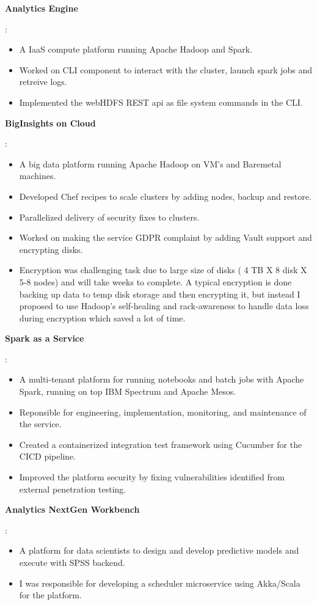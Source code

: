 \documentclass[a4paper,11pt]{article}
\newcommand{\resumeItem}[2]{
  \item[]\small{
    \textbf{#1}{: #2 \vspace{-2pt}}
  }
}
\begin{document}
\resumeItem{Analytics Engine}
{
    \begin{itemize}[leftmargin=*]
        \item A IaaS compute platform running Apache Hadoop and Spark.
        \item Worked on CLI component to interact with the cluster, launch spark jobs and retreive logs.
        \item Implemented the webHDFS REST api as file system commands in the CLI.
    \end{itemize}
}

\resumeItem{BigInsights on Cloud}
{
    \begin{itemize}[leftmargin=*]
        \item A big data platform running Apache Hadoop on VM's and Baremetal machines.
        \item Developed Chef recipes to scale clusters by adding nodes, backup and restore.
        \item Parallelized delivery of security fixes to clusters.
        \item Worked on making the service GDPR complaint by adding Vault support and encrypting disks.
        \item Encryption was challenging task due to large size of disks ( 4 TB X 8 disk X 5-8 nodes) and will take weeks to complete. A typical encryption is done backing up data to temp disk storage and then encrypting it, but instead I proposed to use Hadoop’s self-healing and rack-awareness to handle data loss during encryption which saved a lot of time.
    \end{itemize}
}

\resumeItem{Spark as a Service}
{
    \begin{itemize}[leftmargin=*]
        \item A multi-tenant platform for running notebooks and batch jobs with Apache Spark, running on top IBM Spectrum and Apache Mesos.
        \item Reponsible for engineering, implementation, monitoring, and maintenance of the service.
        \item Created a containerized integration test framework using Cucumber for the CICD pipeline.
        \item Improved the platform security by fixing vulnerabilities identified from external penetration testing.
    \end{itemize}
}

\resumeItem{Analytics NextGen Workbench}
{
    \begin{itemize}[leftmargin=*]
        \item A platform for data scientists to design and develop predictive models and execute with SPSS backend.
        \item I was responsible for developing a scheduler microservice using Akka/Scala for the platform.
    \end{itemize}
}
\end{document}

